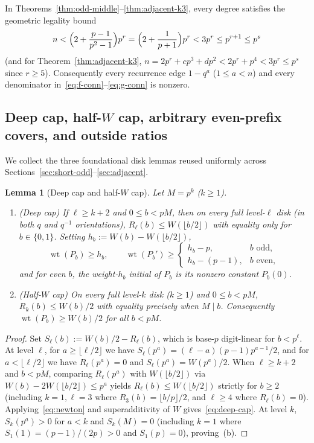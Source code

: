 \documentclass[11pt,reqno]{amsart}
\numberwithin{equation}{section}
\newtheorem{lemma}[theorem]{Lemma}
\theoremstyle{definition}
\theoremstyle{remark}
\newcommand{\wt}{\operatorname{wt}}
\begin{document}
In Theorems~\ref{thm:odd-middle}--\ref{thm:adjacent-k3}, every degree satisfies the geometric legality bound
\begin{equation}
\label{eq:legal-bound}
n < \Bigl(2 + \frac{p-1}{p^2-1}\Bigr) p^r = \Bigl(2 + \frac{1}{p+1}\Bigr)p^r < 3p^r \le p^{r+1} \le p^s
\end{equation}
(and for Theorem~\ref{thm:adjacent-k3}, $n = 2p^r + cp^3 + dp^2 < 2p^r + p^4 < 3p^r \le p^s$ since $r\ge 5$). Consequently every recurrence edge $1-q^a$ ($1\le a < n$) and every denominator in~\eqref{eq:f-conn}--\eqref{eq:g-conn} is nonzero.

\subsection{Deep cap, half-$W$ cap, arbitrary even-prefix covers, and outside ratios}

We collect the three foundational disk lemmas reused uniformly across Sections~\ref{sec:short-odd}--\ref{sec:adjacent}.

\begin{lemma}[Deep cap and half-$W$ cap]
\label{lem:caps}
Let $M=p^k$ ($k\ge 1$).
\begin{enumerate}[label=(\alph*),leftmargin=2em]
\item \emph{(Deep cap)} If $\ell\ge k+2$ and $0\le b < pM$, then on every full level-$\ell$ disk (in both $q$ and $q^{-1}$ orientations), $R_\ell(b) \le W(\lfloor b/2\rfloor)$ with equality only for $b\in\{0,1\}$. Setting $h_b := W(b)-W(\lfloor b/2\rfloor)$,
\begin{equation}
\label{eq:deep-cap}
\wt(P_b) \ge h_b,\qquad
\wt(P_b') \ge \begin{cases} h_b - p, & b\text{ odd},\\ h_b - (p-1), & b\text{ even},\end{cases}
\end{equation}
and for even $b$, the weight-$h_b$ initial of $P_b$ is its nonzero constant $P_b(0)$.
\item \emph{(Half-$W$ cap)} On every full level-$k$ disk ($k\ge 1$) and $0\le b<pM$, $R_k(b)\le W(b)/2$ with equality precisely when $M\mid b$. Consequently $\wt(P_b)\ge W(b)/2$ for all $b<pM$.
\end{enumerate}
\end{lemma}

\begin{proof}
Set $S_\ell(b):=W(b)/2 - R_\ell(b)$, which is base-$p$ digit-linear for $b<p^\ell$. At level $\ell$, for $a\ge \lfloor\ell/2\rfloor$ we have $S_\ell(p^a)=(\ell-a)(p-1)p^{a-1}/2$, and for $a<\lfloor\ell/2\rfloor$ we have $R_\ell(p^a)=0$ and $S_\ell(p^a)=W(p^a)/2$. When $\ell\ge k+2$ and $b<pM$, comparing $R_\ell(p^a)$ with $W(\lfloor b/2\rfloor)$ via $W(b)-2W(\lfloor b/2\rfloor)\le p^a$ yields $R_\ell(b)\le W(\lfloor b/2\rfloor)$ strictly for $b\ge 2$ (including $k=1,\ell=3$ where $R_3(b)=\lfloor b/p\rfloor/2$, and $\ell\ge 4$ where $R_\ell(b)=0$). Applying~\eqref{eq:newton} and superadditivity of $W$ gives~\eqref{eq:deep-cap}. At level $k$, $S_k(p^a)>0$ for $a<k$ and $S_k(M)=0$ (including $k=1$ where $S_1(1)=(p-1)/(2p)>0$ and $S_1(p)=0$), proving~(b).
\end{proof}
\end{document}
